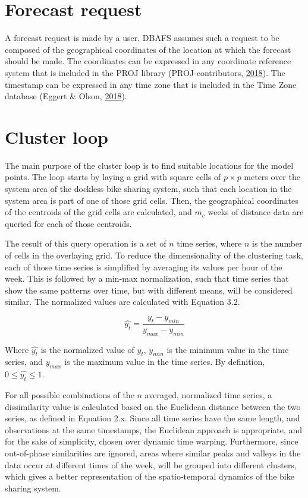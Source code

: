 \documentclass[12pt,oneside]{reedthesis}
\begin{document}
\section{Forecast request}\label{forecast-request}

A forecast request is made by a user. DBAFS assumes such a request to be
composed of the geographical coordinates of the location at which the
forecast should be made. The coordinates can be expressed in any
coordinate reference system that is included in the PROJ library
(PROJ-contributors, \protect\hyperlink{ref-proj}{2018}). The timestamp
can be expressed in any time zone that is included in the Time Zone
database (Eggert \& Olson, \protect\hyperlink{ref-tz}{2018}).

\section{Cluster loop}\label{cluster-loop}

The main purpose of the cluster loop is to find suitable locations for
the model points. The loop starts by laying a grid with square cells of
\(p \times p\) meters over the system area of the dockless bike sharing
system, such that each location in the system area is part of one of
those grid cells. Then, the geographical coordinates of the centroids of
the grid cells are calculated, and \(m_{c}\) weeks of distance data are
queried for each of those centroids.

The result of this query operation is a set of \(n\) time series, where
\(n\) is the number of cells in the overlaying grid. To reduce the
dimensionality of the clustering task, each of those time series is
simplified by averaging its values per hour of the week. This is
followed by a min-max normalization, such that time series that show the
same patterns over time, but with different means, will be considered
similar. The normalized values are calculated with Equation 3.2.

\[ \hat{y_{t}} = \frac{y_{t} - y_{min}}{y_{max} - y_{min}} \]

Where \(\hat{y_{t}}\) is the normalized value of \(y_{t}\), \(y_{min}\)
is the minimum value in the time series, and \(y_{max}\) is the maximum
value in the time series. By definition, \(0 \leq \hat{y_{t}} \leq 1\).

For all possible combinations of the \(n\) averaged, normalized time
series, a dissimilarity value is calculated based on the Euclidean
distance between the two series, as defined in Equation 2.x. Since all
time series have the same length, and observations at the same
timestamps, the Euclidean approach is appropriate, and for the sake of
simplicity, chosen over dynamic time warping. Furthermore, since
out-of-phase similarities are ignored, areas where similar peaks and
valleys in the data occur at different times of the week, will be
grouped into different clusters, which gives a better representation of
the spatio-temporal dynamics of the bike sharing system.
\end{document}
